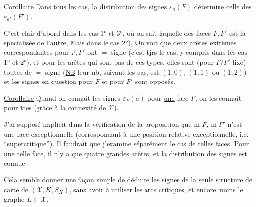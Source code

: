 
\uline{Corollaire} Dans tous les cas, la distribution des signes $\varepsilon_a(F)$ détermine celle des $\varepsilon_{a'}(F')$. 

C'est clair d'abord dans les cas 1° et 3°, où on sait laquelle des faces $F,F'$ est la spécialisée de l'autre,  Mais dans le cas  2°),  On voit que  deux  arêtes extrêmes correspondantes pour $F,F'$ ont $=$ signe (c'est tjrs le cas, y compris dans les cas 1° et 2°), et pour les arêtes qui  sont pas de ces types, elles sont (pour $F/F'$ fixé) toutes de $=$ signe (\uline{NB} leur nb, suivant les cas, est $(1,0)$, $(1,1)$ ou $(1,2)$) et les signes en question pour $F$ et pour $F'$ sont opposés.

\uline{Corollaire} Quand on connaît les signes $\varepsilon_F(a)$ pour \uline{une} face $F$, on les connaît pour \uline{ttes} (grâce à la connexité de $\mathcal X$).

J'ai supposé implicit  dans la vérification de la proposition que ni $F$, ni $F'$ n'est une face exceptionnelle (correspondant à une position relative exceptionnelle, i.e. ``supercritique''). Il faudrait que j'examine séparément  le cas de telles faces. Pour une telle face, il n'y a que quatre grandes arêtes, et la distribution des signes est connue ---

Cela semble donner une façon simple de déduire les signes  de la seule structure de carte de $(\mathcal X,K,S_K)$, sans avoir à utiliser les arcs critiques, et encore moins  le  graphe $L\subset\mathcal X$.
